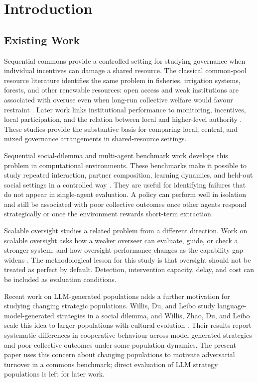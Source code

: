 \section{Introduction}

\subsection{Existing Work}

Sequential commons provide a controlled setting for studying governance when individual incentives can damage a shared resource. The classical common-pool resource literature identifies the same problem in fisheries, irrigation systems, forests, and other renewable resources: open access and weak institutions are associated with overuse even when long-run collective welfare would favour restraint \citep{gordon1954common, scott1955fishery, ostrom1990}. Later work links institutional performance to monitoring, incentives, local participation, and the relation between local and higher-level authority \citep{hilborn2005, gutierrez2011, ostrom1993, ostrom1994, villamayor2020, nagendra2012}. These studies provide the substantive basis for comparing local, central, and mixed governance arrangements in shared-resource settings.

Sequential social-dilemma and multi-agent benchmark work develops this problem in computational environments. These benchmarks make it possible to study repeated interaction, partner composition, learning dynamics, and held-out social settings in a controlled way \citep{leibo2017multiagent, meltingpot2021, socialjax2025}. They are useful for identifying failures that do not appear in single-agent evaluation. A policy can perform well in isolation and still be associated with poor collective outcomes once other agents respond strategically or once the environment rewards short-term extraction.

Scalable oversight studies a related problem from a different direction. Work on scalable oversight asks how a weaker overseer can evaluate, guide, or check a stronger system, and how oversight performance changes as the capability gap widens \citep{bowman2022oversight, engels2025scaling}. The methodological lesson for this study is that oversight should not be treated as perfect by default. Detection, intervention capacity, delay, and cost can be included as evaluation conditions.

Recent work on LLM-generated populations adds a further motivation for studying changing strategic populations. Willis, Du, and Leibo study language-model-generated strategies in a social dilemma, and Willis, Zhao, Du, and Leibo scale this idea to larger populations with cultural evolution \citep{willis2025cooperation, willis2026collective}. Their results report systematic differences in cooperative behaviour across model-generated strategies and poor collective outcomes under some population dynamics. The present paper uses this concern about changing populations to motivate adversarial turnover in a commons benchmark; direct evaluation of LLM strategy populations is left for later work.

